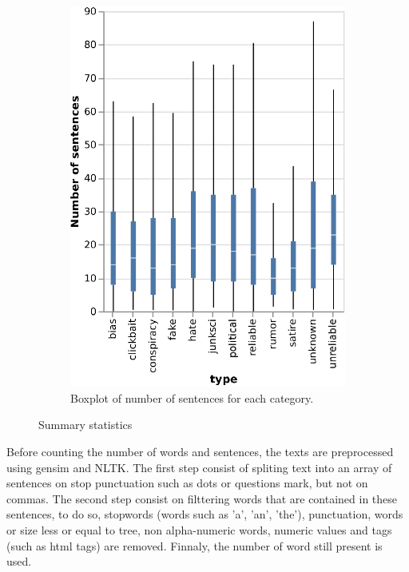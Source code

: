 \begin{figure}[!ht]
\begin{subfigure}[b]{0.4\textwidth}
    \includegraphics{images/data_exploration/boxplot_full_numSentences.eps}
    \caption{Boxplot of number of sentences for each category.}
  \end{subfigure}
  \caption{Summary statistics}
  \label{fig:data_explo:stats1}
\end{figure}

Before counting the number of words and sentences, the texts are preprocessed using gensim\cite{rehurek_lrec} and NLTK\cite{BirdKleinLoper09}. The first step consist of spliting text into an array of sentences on stop punctuation such as dots or questions mark, but not on commas. The second step consist on filttering words that are contained in these sentences, to do so, stopwords (words such as 'a', 'an', 'the'), punctuation, words or size less or equal to tree, non alpha-numeric words, numeric values and tags (such as html tags) are removed. Finnaly, the number of word still present is used. 

